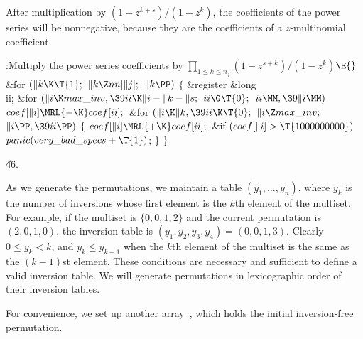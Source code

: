 After multiplication by $(1-z^{k+s})/(1-z^k)$, the coefficients of the
power series will be nonnegative, because they are the coefficients of
a $z$-multinomial coefficient.

\Y\B\4:Multiply the power series coefficients by $\prod_{1\le k\le
n_j}(1-z^{s+k})/(1-z^k)$\X${}\E{}$\6
\&{for} ${}(\|k\K\T{1};{}$ ${}\|k\Z\\{nn}[\|j];{}$ ${}\|k\PP){}$\5
${}\{{}$\5
\1\&{register} \&{long} \\{ii};\7
\&{for} ${}(\|i\K\\{max\_inv},\39\\{ii}\K\|i-\|k-\|s;{}$ ${}\\{ii}\G\T{0};{}$
${}\\{ii}\MM,\39\|i\MM){}$\1\5
${}\\{coef}[\|i]\MRL{-{\K}}\\{coef}[\\{ii}];{}$\2\6
\&{for} ${}(\|i\K\|k,\39\\{ii}\K\T{0};{}$ ${}\|i\Z\\{max\_inv};{}$ ${}\|i\PP,%
\39\\{ii}\PP){}$\5
${}\{{}$\1\6
${}\\{coef}[\|i]\MRL{+{\K}}\\{coef}[\\{ii}];{}$\6
\&{if} ${}(\\{coef}[\|i]>\T{1000000000}){}$\1\5
${}\\{panic}(\\{very\_bad\_specs}+\T{1}){}$;\2\6
\4${}\}{}$\2\6
\4${}\}{}$\2\par
\U46.\fi

As we generate the permutations, we maintain a table $(y_1,\ldots,y_n)$,
where $y_k$ is the number of
inversions whose first element is the $k$th element of the multiset.
For example, if the multiset is $\{0,0,1,2\}$ and the current permutation is
$(2,0,1,0)$, the inversion table is $(y_1,y_2,y_3,y_4)=(0,0,1,3)$. Clearly
$0\le y_k<k$, and $y_k\le y_{k-1}$ when the $k$th element of the multiset
is the same as the $(k-1)$st element. These conditions are necessary
and sufficient to define a valid inversion table. We will generate
permutations in lexicographic order of their inversion tables.

For convenience, we set up another array~, which holds the
initial inversion-free permutation.

